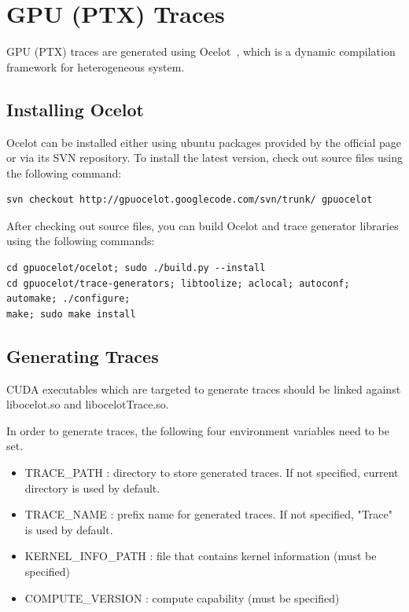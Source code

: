 \section{GPU (PTX) Traces}
\label{sec:gpu_traces}

GPU (PTX) traces are generated using Ocelot~\cite{ocelot}, which is a dynamic compilation
framework for heterogeneous system. 


\subsection{Installing Ocelot}

Ocelot can be installed either using ubuntu packages provided by the official
page or via its SVN repository. To install the latest version, check out 
source files using the following command:


\begin{Verbatim}
svn checkout http://gpuocelot.googlecode.com/svn/trunk/ gpuocelot
\end{Verbatim}


After checking out source files, you can build Ocelot and trace generator libraries using the following commands:


\begin{Verbatim}
cd gpuocelot/ocelot; sudo ./build.py --install
cd gpuocelot/trace-generators; libtoolize; aclocal; autoconf; automake; ./configure; 
make; sudo make install
\end{Verbatim}


\subsection{Generating Traces}

CUDA executables which are targeted to generate traces should be linked against
libocelot.so and libocelotTrace.so.

In order to generate traces, the following four environment variables need to be set.

\begin{itemize}\itemsep2pt
\item TRACE\_PATH : directory to store generated traces. If not specified, current directory is used by default.
\item TRACE\_NAME : prefix name for generated traces. If not specified, "Trace" is used by default.
\item KERNEL\_INFO\_PATH : file that contains kernel information (must be specified)
\item COMPUTE\_VERSION : compute capability (must be specified)
\end{itemize}

